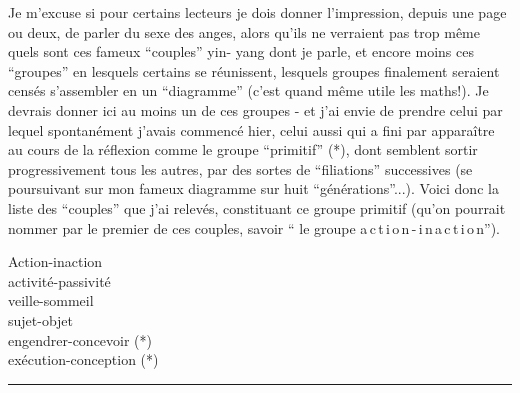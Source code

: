 Je m'excuse si pour certains lecteurs je dois donner l'impression, depuis une page ou deux, de parler du sexe des anges, alors qu'ils ne verraient pas trop même quels sont ces fameux ``couples'' yin- yang dont je parle, et encore moins ces ``groupes'' en lesquels certains se réunissent, lesquels groupes finalement seraient censés s'assembler en un ``diagramme'' (c'est quand même utile les maths!). Je devrais donner ici au moins un de ces groupes - et j'ai envie de prendre celui par lequel spontanément j'avais commencé hier, celui aussi qui a fini par apparaître au cours de la réflexion comme le groupe ``primitif'' (*), dont semblent sortir progressivement tous les autres, par des sortes de ``filiations'' successives (se poursuivant sur mon fameux diagramme sur huit ``générations''...). Voici donc la liste des ``couples'' que j'ai relevés, constituant ce groupe primitif (qu'on pourrait nommer par le premier de ces couples, savoir `` le groupe a\,c\,t\,i\,o\,n\handwritten{\unsure{$\checkmark$|,}}\,-\,i\,n\,a\,c\,t\,i\,o\,n'').

\begin{flushleft}
Action-inaction\\
activité-passivité\\
veille-sommeil\\
sujet-objet\\
engendrer-concevoir (*)\\
exécution-conception (*)
\end{flushleft}

\noindent\rule{3cm}{.35pt}

